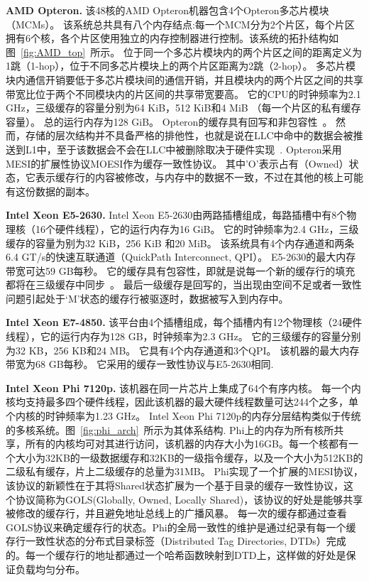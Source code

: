 \textbf{AMD Opteron.} 该48核的AMD Opteron机器包含4个Opteron多芯片模块（MCMs）。
该系统总共具有八个内存结点:每一个MCM分为2个片区，每个片区拥有6个核，各个片区使用独立的内存控制器进行控制。该系统的拓扑结构如图~\ref{fig:AMD_top}~所示。
位于同一个多芯片模块内的两个片区之间的距离定义为1跳（1-hop），位于不同多芯片模块上的两个片区距离为2跳（2-hop）。
多芯片模块内通信开销要低于多芯片模块间的通信开销，并且模块内的两个片区之间的共享带宽比位于两个不同模块内的片区间的共享带宽要高。
它的CPU的时钟频率为2.1 GHz，三级缓存的容量分别为64 KiB，512 KiB和4 MiB （每一个片区的私有缓存容量）。
总的运行内存为128 GiB。
Opteron的缓存具有回写和非包容性~\cite{Conway2010Cache}。
然而，存储的层次结构并不具备严格的排他性，也就是说在LLC中命中的数据会被推送到L1中，至于该数据会不会在LLC中被删除取决于硬件实现~\cite{2011Software}.
Opteron采用MESI的扩展性协议MOESI作为缓存一致性协议。
其中’O’表示占有（Owned）状态，它表示缓存行的内容被修改，与内存中的数据不一致，不过在其他的核上可能有这份数据的副本。

\textbf{Intel Xeon E5-2630.} Intel Xeon E5-2630由两路插槽组成，每路插槽中有8个物理核（16个硬件线程），它的运行内存为16 GiB。
它的时钟频率为2.4 GHz，三级缓存的容量为别为32 KiB，256 KiB 和20 MiB。
该系统具有4个内存通道和两条6.4 GT/s的快速互联通道（QuickPath Interconnect, QPI）。
E5-2630的最大内存带宽可达59 GB每秒。
它的缓存具有包容性，即就是说每一个新的缓存行的填充都将在三级缓存中同步~\cite{intel2016}。
最后一级缓存是回写的，当出现由空间不足或者一致性问题引起处于‘M’状态的缓存行被驱逐时，数据被写入到内存中。

\textbf{Intel Xeon E7-4850.} 该平台由4个插槽组成，每个插槽内有12个物理核（24硬件线程），它的运行内存为128 GB，时钟频率为2.3 GHz。
它的三级缓存的容量分别为32 KB，256 KB和24 MB。
它具有4个内存通道和3个QPI。
该机器的最大内存带宽为68 GB每秒。
它采用的缓存一致性协议与E5-2630相同.

\textbf{Intel Xeon Phi 7120p.} 该机器在同一片芯片上集成了64个有序内核。
每一个内核均支持最多四个硬件线程，因此该机器的最大硬件线程数量可达244个之多，单个内核的时钟频率为1.23 GHz。
Intel Xeon Phi 7120p的内存分层结构类似于传统的多核系统。图~\ref{fig:phi_arch}~所示为其体系结构.
Phi上的内存为所有核所共享，所有的内核均可对其进行访问，该机器的内存大小为16GB。每一个核都有一个大小为32KB的一级数据缓存和32KB的一级指令缓存，以及一个大小为512KB的二级私有缓存，片上二级缓存的总量为31MB。
Phi实现了一个扩展的MESI协议，该协议的新颖性在于其将Shared状态扩展为一个基于目录的缓存一致性协议，这个协议简称为GOLS(Globally, Owned, Locally Shared)，该协议的好处是能够共享被修改的缓存行，并且避免地址总线上的广播风暴。
每一次的缓存都通过查看GOLS协议来确定缓存行的状态。Phi的全局一致性的维护是通过纪录有每一个缓存行一致性状态的分布式目录标签（Distributed Tag Directories, DTDs）完成的。每一个缓存行的地址都通过一个哈希函数映射到DTD上，这样做的好处是保证负载均匀分布。


